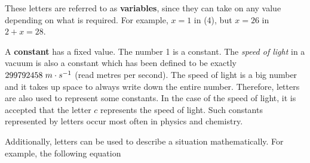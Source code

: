       \label{m38346*id172141}These letters are referred to as \textbf{variables}, since they can take on any value depending on what is required. For example, $x=1$ in (4), but $x=26$\hspace{1ex} in $2+x=28$.\par 
      \label{m38346*id172198}A \textbf{constant} has a fixed value. The number 1 is a constant. The \textsl{speed of light} in a vacuum is also a constant which has been defined to be exactly $299 792 458\phantom{\rule{3pt}{0ex}}m\ensuremath{\cdot}s{}^{-1}$ (read metres per second). The speed of light is a big number and it takes up space to always write down the entire number. Therefore, letters are also used to represent some constants. In the case of the speed of light, it is accepted that the letter $c$ represents the speed of light. Such constants represented by letters occur most often in physics and chemistry.\par 
      \label{m38346*id172250}Additionally, letters can be used to describe a situation mathematically. For example, the following equation\par 
      \label{m38346*uid4}\nopagebreak\noindent{}
